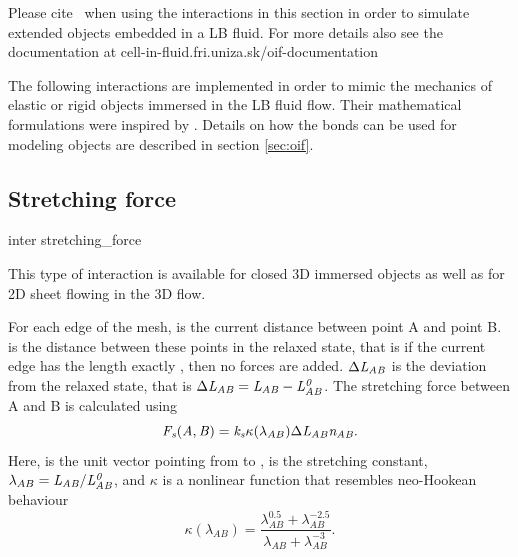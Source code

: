 \begin{citebox}
  Please cite~ when using the interactions
  in this section in order to simulate extended objects embedded in a
  LB fluid. For more details also see the documentation at cell-in-fluid.fri.uniza.sk/oif-documentation
\end{citebox}

The following interactions are implemented in order to mimic the mechanics of 
elastic or rigid objects immersed in the LB fluid flow. Their mathematical formulations 
were inspired by \cite{dupin07}. Details on how the bonds 
can be used for modeling objects are described in section \ref{sec:oif}.

\subsection{Stretching force}

\begin{essyntax}
  inter 
  stretching_force
   
\end{essyntax}
This type of interaction is available for closed 3D immersed objects as well as 
for 2D sheet flowing in the 3D flow. 

For each edge of the mesh,  is the current distance between point A 
and point B.  is the distance between these points in the relaxed 
state, that is if the current edge has the length exactly , then 
no forces are added. $\Delta \var{L_{AB}}$ is the deviation from the relaxed 
state, that is $\Delta \var{L_{AB}} = \var{L_{AB}} - \var{L_{AB}^0}$. The 
stretching force between A and B is calculated using 
\begin{equation}
\var{F_s(A,B)} = \var{k_s}\kappa(\lambda_{AB})\Delta \var{L_{AB}}\var{n_{AB}}.
\end{equation}
Here,  is the unit vector pointing from  to ,  
is the stretching constant, $\lambda_{AB} = \var{L_{AB}}/\var{L_{AB}^0}$, and 
$\kappa$ is a nonlinear function that resembles neo-Hookean behaviour
\begin{equation}
\kappa(\lambda_{AB}) = \frac{\lambda_{AB}^{0.5} + \lambda_{AB}^{-2.5}}
{\lambda_{AB} + \lambda_{AB}^{-3}}.
\end{equation}


